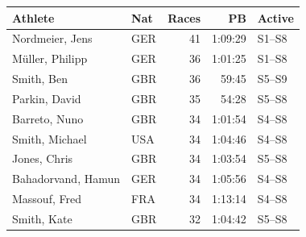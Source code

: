 \begin{tabular}{llrrl}
\toprule
\textbf{Athlete} & \textbf{Nat} & \multicolumn{1}{r}{\textbf{Races}} & \multicolumn{1}{r}{\textbf{PB}} & \textbf{Active} \\
\midrule
Nordmeier, Jens & GER & 41 & 1:09:29 & S1--S8 \\
Müller, Philipp & GER & 36 & 1:01:25 & S1--S8 \\
Smith, Ben & GBR & 36 & 59:45 & S5--S9 \\
Parkin, David & GBR & 35 & 54:28 & S5--S8 \\
Barreto, Nuno & GBR & 34 & 1:01:54 & S4--S8 \\
Smith, Michael & USA & 34 & 1:04:46 & S4--S8 \\
Jones, Chris & GBR & 34 & 1:03:54 & S5--S8 \\
Bahadorvand, Hamun & GER & 34 & 1:05:56 & S4--S8 \\
Massouf, Fred & FRA & 34 & 1:13:14 & S4--S8 \\
Smith, Kate & GBR & 32 & 1:04:42 & S5--S8 \\
\bottomrule
\end{tabular}